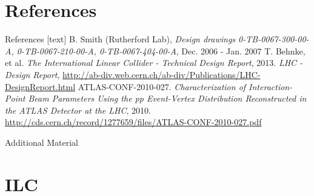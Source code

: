 \documentclass[xcolor={dvipsnames}]{beamer}
\begin{document}
\section*{References}
\begin{thebibliography}{9}
\begin{frame}{References}
[text]
 B. Smith (Rutherford Lab), \emph{Design drawings 0-TB-0067-300-00-A, 0-TB-0067-210-00-A, 0-TB-0067-404-00-A}, Dec. 2006 - Jan. 2007
 T. Behnke, et al.
\emph{The International Linear Collider - Technical Design Report}, 2013.
 \emph{LHC - Design Report}, \url{http://ab-div.web.cern.ch/ab-div/Publications/LHC-DesignReport.html}
 ATLAS-CONF-2010-027. \emph{Characterization of Interaction-Point Beam Parameters Using the pp Event-Vertex Distribution Reconstructed in the ATLAS Detector at the LHC}, 2010. \url{http://cds.cern.ch/record/1277659/files/ATLAS-CONF-2010-027.pdf}
\end{frame}
\end{thebibliography}

\appendix

\begin{frame}
\begin{center}
\LARGE Additional Material
\end{center}
  \tableofcontents
\end{frame}

\section{ILC}

\end{document}

